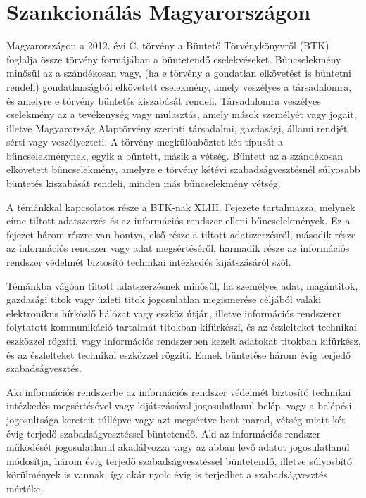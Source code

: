 \section{Szankcionálás Magyarországon}

Magyarországon a 2012. évi C. törvény a Büntető Törvénykönyvről (BTK) \cite{2012-C-torveny} foglalja össze törvény formájában a büntetendő cselekvéseket. Bűncselekmény minősül az a szándékosan vagy, (ha e törvény a gondatlan elkövetést is büntetni rendeli) gondatlanságból elkövetett cselekmény, amely veszélyes a társadalomra, és amelyre e törvény büntetés kiszabását rendeli. Társadalomra veszélyes cselekmény az a tevékenység vagy mulasztás, amely mások személyét vagy jogait, illetve Magyarország Alaptörvény szerinti társadalmi, gazdasági, állami rendjét sérti vagy veszélyezteti. A törvény megkülönböztet két típusát a bűncselekménynek, egyik a bűntett, másik a vétség. Bűntett az a szándékosan elkövetett bűncselekmény, amelyre e törvény kétévi szabadságvesztésnél súlyosabb büntetés kiszabását rendeli, minden más bűncselekmény vétség.

A témánkkal kapcsolatos része a BTK-nak XLIII. Fejezete tartalmazza, melynek címe tiltott adatszerzés és az információs rendszer elleni bűncselekmények. Ez a fejezet három részre van bontva, első része a tiltott adatszerzésről, második része az információs rendszer vagy adat megsértéséről, harmadik része az információs rendszer védelmét biztosító technikai intézkedés kijátszásáról szól.

Témánkba vágóan tiltott adatszerzésnek minősül, ha személyes adat, magántitok, gazdasági titok vagy üzleti titok jogosulatlan megismerése céljából valaki elektronikus hírközlő hálózat vagy eszköz útján, illetve információs rendszeren folytatott kommunikáció tartalmát titokban kifürkészi, és az észlelteket technikai eszközzel rögzíti, vagy információs rendszerben kezelt adatokat titokban kifürkész, és az észlelteket technikai eszközzel rögzíti. Ennek büntetése három évig terjedő szabadságvesztés.

Aki információs rendszerbe az információs rendszer védelmét biztosító technikai intézkedés megsértésével vagy kijátszásával jogosulatlanul belép, vagy a belépési jogosultsága kereteit túllépve vagy azt megsértve bent marad, vétség miatt két évig terjedő szabadságvesztéssel büntetendő. Aki az információs rendszer működését jogosulatlanul akadályozza vagy az abban levő adatot jogosulatlanul módosítja, három évig terjedő szabadságvesztéssel büntetendő, illetve súlyosbító körülmények is vannak, így akár nyolc évig is terjedhet a szabadságvesztés mértéke.

